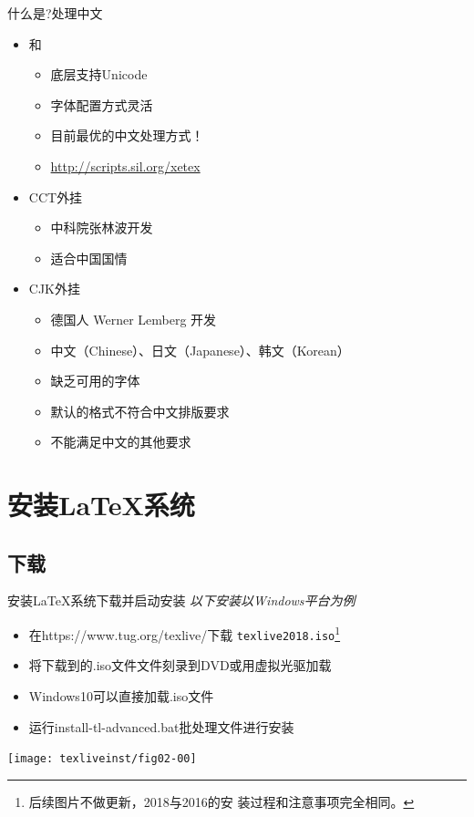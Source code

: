 \documentclass[xcolor=svgnames, t, 10pt]{ctexbeamer}%
\begin{document}
\begin{frame}[t]{什么是\latex?}{处理中文}
  \stretchon
  \begin{itemize}
  \item \alert{\XeTeX}和\alert{\XeLaTeX}
    \begin{itemize}
    \item 底层支持\alert{Unicode}
    \item 字体配置方式灵活
    \item \alert{目前最优的中文处理方式！}
    \item \url{http://scripts.sil.org/xetex}
    \end{itemize}
  \item CCT\alert{外挂}
    \begin{itemize}
    \item 中科院张林波开发
    \item 适合中国国情
    \end{itemize}  
  \item CJK\alert{外挂}
    \begin{itemize}
    \item 德国人 Werner Lemberg 开发
    \item 中文（\alert{C}hinese）、日文（\alert{J}apanese）、韩文（\alert{K}orean）
    \item 缺乏可用的字体
    \item 默认的格式不符合中文排版要求
    \item 不能满足中文的其他要求
    \end{itemize}  
  \end{itemize}
  \stretchoff
\end{frame}

\section[安装\LaTeX ]{安装\LaTeX 系统}\label{sec01-04}
\subsection[下载]{下载}
\begin{frame}[t]{安装\LaTeX 系统}{下载并启动安装}
  \stretchon
  \emph{以下安装以Windows平台为例}
  \begin{itemize}
  \item 在\url{}{https://www.tug.org/texlive/}下载
    \texttt{texlive2018.iso}\footnote[frame]{后续图片不做更新，2018与2016的安
      装过程和注意事项完全相同。}
  \item 将下载到的.iso文件文件刻录到DVD或用虚拟光驱加载
  \item Windows10可以\alert{直接加载}.iso文件
  \item 运行install-tl-advanced.bat批处理文件进行安装
  \end{itemize}
  \centering
  \texttt{[image: texliveinst/fig02-00]}
  \stretchoff
\end{frame}
\end{document}
